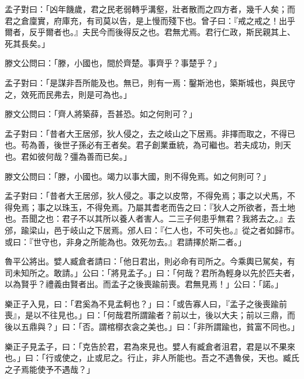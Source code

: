 \begin{pinyinscope}
孟子對曰：「凶年饑歲，君之民老弱轉乎溝壑，壯者散而之四方者，幾千人矣；而君之倉廩實，府庫充，有司莫以告，是上慢而殘下也。曾子曰：『戒之戒之！出乎爾者，反乎爾者也。』夫民今而後得反之也。君無尤焉。君行仁政，斯民親其上、死其長矣。」

滕文公問曰：「滕，小國也，間於齊楚。事齊乎？事楚乎？」

孟子對曰：「是謀非吾所能及也。無已，則有一焉：鑿斯池也，築斯城也，與民守之，效死而民弗去，則是可為也。」

滕文公問曰：「齊人將築薛，吾甚恐。如之何則可？」

孟子對曰：「昔者大王居邠，狄人侵之，去之岐山之下居焉。非擇而取之，不得已也。苟為善，後世子孫必有王者矣。君子創業垂統，為可繼也。若夫成功，則天也。君如彼何哉？彊為善而已矣。」

滕文公問曰：「滕，小國也。竭力以事大國，則不得免焉。如之何則可？」

孟子對曰：「昔者大王居邠，狄人侵之。事之以皮幣，不得免焉；事之以犬馬，不得免焉；事之以珠玉，不得免焉。乃屬其耆老而告之曰：『狄人之所欲者，吾土地也。吾聞之也：君子不以其所以養人者害人。二三子何患乎無君？我將去之。』去邠，踰梁山，邑于岐山之下居焉。邠人曰：『仁人也，不可失也。』從之者如歸市。或曰：『世守也，非身之所能為也。效死勿去。』君請擇於斯二者。」

魯平公將出。嬖人臧倉者請曰：「他日君出，則必命有司所之。今乘輿已駕矣，有司未知所之。敢請。」公曰：「將見孟子。」曰：「何哉？君所為輕身以先於匹夫者，以為賢乎？禮義由賢者出。而孟子之後喪踰前喪。君無見焉！」公曰：「諾。」

樂正子入見，曰：「君奚為不見孟軻也？」曰：「或告寡人曰，『孟子之後喪踰前喪』，是以不往見也。」曰：「何哉君所謂踰者？前以士，後以大夫；前以三鼎，而後以五鼎與？」曰：「否。謂棺槨衣衾之美也。」曰：「非所謂踰也，貧富不同也。」

樂正子見孟子，曰：「克告於君，君為來見也。嬖人有臧倉者沮君，君是以不果來也。」曰：「行或使之，止或尼之。行止，非人所能也。吾之不遇魯侯，天也。臧氏之子焉能使予不遇哉？」


\end{pinyinscope}